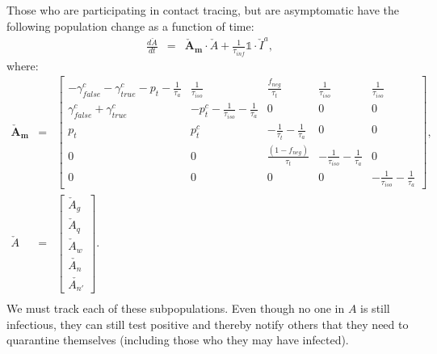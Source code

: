 \documentclass[notitlepage, superscriptaddress]{revtex4-2}
\begin{document}
Those who are participating in contact tracing, but are asymptomatic have the following population change as a function of time:
\begin{eqnarray}
\frac{d\check{A}}{dt} &=& \boldsymbol{\check{A}_{m}} \cdot  \check{A} + \frac{1}{\tau_{inf}} \mathbb{1} \cdot  \check{I}^{a}, 
\end{eqnarray}
where:
%
\begin{eqnarray}
\boldsymbol{\check{A}_{m}}&=&
\begin{bmatrix}
 -\gamma^{c}_{false} -\gamma^{c}_{true} - p_{t} -\frac{1}{\tau_{a}} & \frac{1}{\tau_{iso}}  & \frac{f_{neg}}{\tau_{t}} & \frac{1}{\tau_{iso}} & \frac{1}{\tau_{iso}} \\
\gamma^{c}_{false} + \gamma^{c}_{true}    &  -p^{c}_{t}  - \frac{1}{\tau_{iso}} - \frac{1}{\tau_{a}}      &  0    & 0  & 0\\
p_{t}     &  p^{c}_{t}                  &  -\frac{1}{\tau_{t}}  - \frac{1}{\tau_{a}}  & 0 & 0\\
0 & 0 & \frac{(1-f_{neg})}{\tau_{t}}  & -\frac{1}{\tau_{iso}}  -  \frac{1}{\tau_{a}} & 0 \\ 
0 & 0 & 0 & 0 & -\frac{1}{\tau_{iso}}  -  \frac{1}{\tau_{a}}
\end{bmatrix}, \\ 
%
\check{A} &=& 
\begin{bmatrix}
\check{A}_{g} \\ \check{A}_{q} \\ \check{A}_{w}\\ \check{A_{n}} \\ \check{A_{n'}}
\end{bmatrix}. \\ 
%
% 
\end{eqnarray}
We must track each of these subpopulations. Even though no one in $A$ is still infectious, they can still test positive and thereby notify others that they need to quarantine themselves (including those who they may have infected). 
\end{document}
